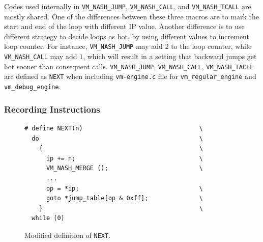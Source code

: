 \documentclass[preprint, 10pt]{sigplanconf}
\begin{document}
Codes used internally in \texttt{VM\_NASH\_JUMP}, \texttt{VM\_NASH\_CALL}, and
\texttt{VM\_NASH\_TCALL} are mostly shared. One of the differences between these
three macros are to mark the start and end of the loop with different IP
value. Another difference is to use different strategy to decide loops as hot,
by using different values to increment loop counter. For instance,
\texttt{VM\_NASH\_JUMP} may add $2$ to the loop counter, while
\texttt{VM\_NASH\_CALL} may add $1$, which will result in a setting that
backward jumps get hot sooner than consequent calls. \texttt{VM\_NASH\_JUMP},
\texttt{VM\_NASH\_CALL}, \texttt{VM\_NASH\_TACLL} are defined as \texttt{NEXT}
when including \texttt{vm-engine.c} file for \texttt{vm\_regular\_engine} and
\texttt{vm\_debug\_engine}.

\subsubsection{Recording Instructions}

\begin{figure}
  \centering
  \small
\begin{verbatim}
# define NEXT(n)                                \
  do                                            \
    {                                           \
      ip += n;                                  \
      VM_NASH_MERGE ();                         \
      ...
      op = *ip;                                 \
      goto *jump_table[op & 0xff];              \
    }                                           \
  while (0)
\end{verbatim}
\caption{Modified definition of \texttt{NEXT}.}
\label{fig:cnext}
\end{figure}
\end{document}
